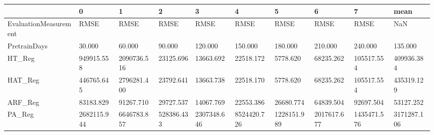\begin{tabular}{llllllllll}
\toprule
{} &            0 &            1 &           2 &            3 &            4 &            5 &            6 &            7 &         mean \\
\midrule
EvaluationMeasurement &         RMSE &         RMSE &        RMSE &         RMSE &         RMSE &         RMSE &         RMSE &         RMSE &          NaN \\
PretrainDays          &       30.000 &       60.000 &      90.000 &      120.000 &      150.000 &      180.000 &      210.000 &      240.000 &      135.000 \\
HT\_Reg                &   949915.558 &  2090736.516 &   23125.696 &    13663.692 &    22518.172 &     5778.620 &    68235.262 &   105517.554 &   409936.384 \\
HAT\_Reg               &   446765.645 &  2796281.400 &   23792.641 &    13663.738 &    22518.170 &     5778.620 &    68235.262 &   105517.554 &   435319.129 \\
ARF\_Reg               &    83183.829 &    91267.710 &   29727.537 &    14067.769 &    22553.386 &    26680.774 &    64839.504 &    92697.504 &    53127.252 \\
PA\_Reg                &  2682115.944 &  6646783.857 &  528386.433 &  2307348.646 &  8524420.726 &  1228151.989 &  2017617.677 &  1435471.576 &  3171287.106 \\
\bottomrule
\end{tabular}
